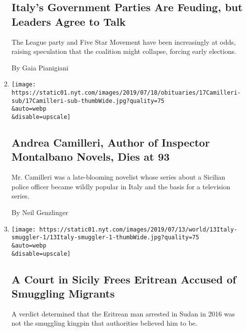 \begin{enumerate}
{  \subsection{Italy's Government Parties Are Feuding, but Leaders Agree
  to
  Talk}\label{italys-government-parties-are-feuding-but-leaders-agree-to-talk}}

  The League party and Five Star Movement have been increasingly at
  odds, raising speculation that the coalition might collapse, forcing
  early elections.

  By Gaia Pianigiani
\item
  \href{/2019/07/17/obituaries/andrea-camilleri-dead.html}{}

  \texttt{[image: https://static01.nyt.com/images/2019/07/18/obituaries/17Camilleri-sub/17Camilleri-sub-thumbWide.jpg?quality=75\\\&auto=webp\\\&disable=upscale]}

  \hypertarget{andrea-camilleri-author-of-inspector-montalbano-novels-dies-at-93}{%
  \subsection{Andrea Camilleri, Author of Inspector Montalbano Novels,
  Dies at
  93}\label{andrea-camilleri-author-of-inspector-montalbano-novels-dies-at-93}}

  Mr. Camilleri was a late-blooming novelist whose series about a
  Sicilian police officer became wildly popular in Italy and the basis
  for a television series.

  By Neil Genzlinger
\item
  \href{/2019/07/13/world/europe/a-court-in-sicily-frees-eritrean-accused-of-smuggling-migrants.html}{}

  \texttt{[image: https://static01.nyt.com/images/2019/07/13/world/13Italy-smuggler-1/13Italy-smuggler-1-thumbWide.jpg?quality=75\\\&auto=webp\\\&disable=upscale]}

  \hypertarget{a-court-in-sicily-frees-eritrean-accused-of-smuggling-migrants}{%
  \subsection{A Court in Sicily Frees Eritrean Accused of Smuggling
  Migrants}\label{a-court-in-sicily-frees-eritrean-accused-of-smuggling-migrants}}

  A verdict determined that the Eritrean man arrested in Sudan in 2016
  was not the smuggling kingpin that authorities believed him to be.


\end{enumerate}

